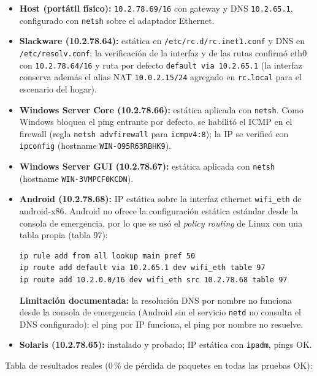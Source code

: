 \documentclass[11pt,a4paper]{report}
\begin{document}
\begin{itemize}
  \item \textbf{Host (portátil físico):} \texttt{10.2.78.69/16} con gateway y DNS \texttt{10.2.65.1}, configurado con \texttt{netsh} sobre el adaptador Ethernet.
  \item \textbf{Slackware (10.2.78.64):} estática en \texttt{/etc/rc.d/rc.inet1.conf} y DNS en \texttt{/etc/resolv.conf}; la verificación de la interfaz y de las rutas confirmó eth0 con \texttt{10.2.78.64/16} y ruta por defecto \texttt{default via 10.2.65.1} (la interfaz conserva además el alias NAT \texttt{10.0.2.15/24} agregado en \texttt{rc.local} para el escenario del hogar).
  \item \textbf{Windows Server Core (10.2.78.66):} estática aplicada con \texttt{netsh}. Como Windows bloquea el ping entrante por defecto, se habilitó el ICMP en el firewall (regla \texttt{netsh advfirewall} para \texttt{icmpv4:8}); la IP se verificó con \texttt{ipconfig} (hostname \texttt{WIN-O95R63RBHK9}).
  \item \textbf{Windows Server GUI (10.2.78.67):} estática aplicada con \texttt{netsh} (hostname \texttt{WIN-3VMPCF0KCDN}).
  \item \textbf{Android (10.2.78.68):} IP estática sobre la interfaz ethernet \texttt{wifi\_eth} de android-x86. Android no ofrece la configuración estática estándar desde la consola de emergencia, por lo que se usó el \emph{policy routing} de Linux con una tabla propia (tabla 97):
\begin{verbatim}
ip rule add from all lookup main pref 50
ip route add default via 10.2.65.1 dev wifi_eth table 97
ip route add 10.2.0.0/16 dev wifi_eth src 10.2.78.68 table 97
\end{verbatim}
  \textbf{Limitación documentada:} la resolución DNS por nombre no funciona desde la consola de emergencia (Android sin el servicio \texttt{netd} no consulta el DNS configurado): el ping por IP funciona, el ping por nombre no resuelve.
  \item \textbf{Solaris (10.2.78.65):} instalado y probado; IP estática con \texttt{ipadm}, pings OK.
\end{itemize}

Tabla de resultados reales (0\,\% de pérdida de paquetes en todas las pruebas OK):
\end{document}
